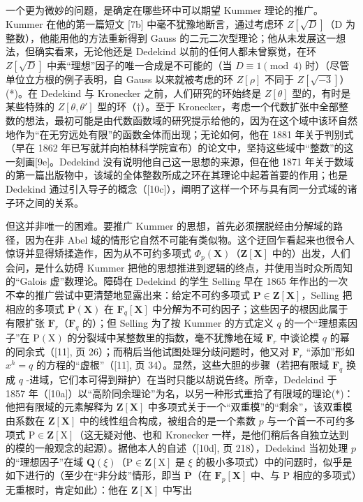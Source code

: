 一个更为微妙的问题，是确定在哪些环中可以期望 Kummer 理论的推广。Kummer 在他的第一篇短文 {[}7b{]} 中毫不犹豫地断言，通过考虑环 \(Z[\sqrt{D}]\)（D 为整数），他能用他的方法重新得到 Gauss 的二元二次型理论；他从未发展这一想法，但确实看来，无论他还是 Dedekind 以前的任何人都未曾察觉，在环 \(Z[\sqrt{D}]\) 中素“理想”因子的唯一合成是不可能的（当 \(D \equiv 1 \pmod{4}\) 时）（尽管单位立方根的例子表明，自 Gauss 以来就被考虑的环 \(Z[\rho]\) 不同于 \(Z[\sqrt{-3}]\)）(*)。在 Dedekind 与 Kronecker 之前，人们研究的环始终是 \(Z[\theta]\) 型的，有时是某些特殊的 \(Z[\theta, \theta']\) 型的环（†）。至于 Kronecker，考虑一个代数扩张中全部整数的想法，最初可能是由代数函数域的研究提示给他的，因为在这个域中该环自然地作为“在无穷远处有限”的函数全体而出现；无论如何，他在 1881 年关于判别式（早在 1862 年已写就并向柏林科学院宣布）的论文中，坚持这些域中“整数”的这一刻画{[}9e{]}。Dedekind 没有说明他自己这一思想的来源，但在他 1871 年关于数域的第一篇出版物中，该域的全体整数所成之环在其理论中起着首要的作用；也是 Dedekind 通过引入导子的概念（{[}10c{]}），阐明了这样一个环与具有同一分式域的诸子环之间的关系。

但这并非唯一的困难。要推广 Kummer 的思想，首先必须摆脱经由分解域的路径，因为在非 Abel 域的情形它自然不可能有类似物。这个迂回乍看起来也很令人惊讶并显得矫揉造作，因为从不可约多项式 \(\Phi_p(\mathbf{X})\)（\(\mathbf{Z}[\mathbf{X}]\) 中的）出发，人们会问，是什么妨碍 Kummer 把他的思想推进到逻辑的终点，并使用当时众所周知的“Galois 虚”数理论。障碍在 Dedekind 的学生 Selling 早在 1865 年作出的一次不幸的推广尝试中更清楚地显露出来：给定不可约多项式 \(\mathbf{P} \in \mathbf{Z}[\mathbf{X}]\)，Selling 把相应的多项式 \(\overline{\mathbf{P}}(\mathbf{X})\) 在 \(\mathbf{F}_q[\mathbf{X}]\) 中分解为不可约因子；这些因子的根因此属于有限扩张 \(\mathbf{F}_r\)（\(\mathbf{F}_q\) 的）；但 Selling 为了按 Kummer 的方式定义 \(q\) 的一个“理想素因子”在 \(\mathrm{P}(\mathrm{X})\) 的分裂域中某整数里的指数，毫不犹豫地在域 \(\mathbf{F}_r\) 中谈论模 \(q\) 的幂的同余式（{[}11{]}, 页 26）；而稍后当他试图处理分歧问题时，他又对 \(\mathbf{F}_r\) “添加”形如 \(x^h = q\) 的方程的“虚根”（{[}11{]}, 页 34）。显然，这些大胆的步骤（若把有限域 \(\mathbf{F}_q\) 换成 \(q\) -进域，它们本可得到辩护）在当时只能以胡说告终。所幸，Dedekind 于 1857 年（{[}10a{]}）以“高阶同余理论”为名，以另一种形式重拾了有限域的理论(*)：他把有限域的元素解释为 \(\mathbf{Z}[\mathbf{X}]\) 中多项式关于一个“双重模”的“剩余”，该双重模由系数在 \(\mathbf{Z}[\mathbf{X}]\) 中的线性组合构成，被组合的是一个素数 \(p\) 与一个首一不可约多项式 \(\mathrm{P} \in \mathbf{Z}[\mathrm{X}]\)（这无疑对他、也和 Kronecker 一样，是他们稍后各自独立达到的模的一般观念的起源）。据他本人的自述（{[}10d{]}, 页 218），Dedekind 当初处理 \(p\) 的“理想因子”在域 \(\mathbf{Q}(\xi)\)（\(\mathrm{P} \in \mathbf{Z}[\mathrm{X}]\) 是 \(\xi\) 的极小多项式）中的问题时，似乎是如下进行的（至少在“非分歧”情形，即当 \(\overline{\mathbf{P}}\)（在 \(\mathbf{F}_p[\mathbf{X}]\) 中、与 \(\mathrm{P}\) 相应的多项式）无重根时，肯定如此）：他在 \(\mathbf{Z}[\mathbf{X}]\) 中写出

